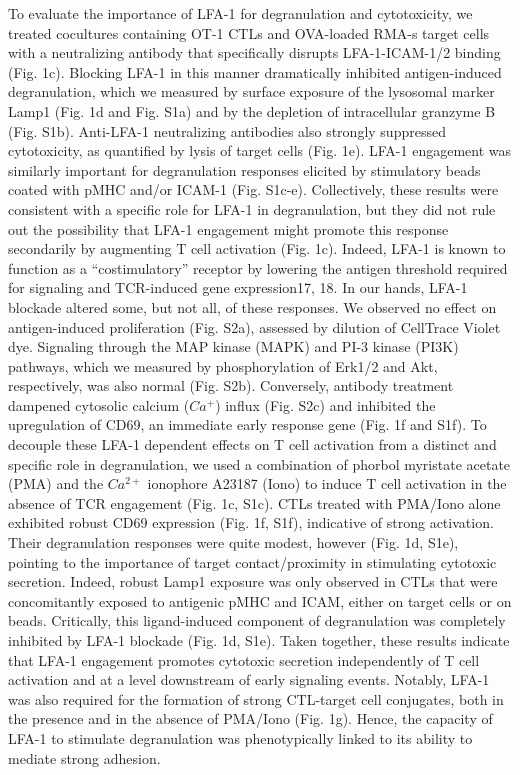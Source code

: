 To evaluate the importance of LFA-1 for degranulation and cytotoxicity, we treated cocultures containing OT-1 CTLs and OVA-loaded RMA-s target cells with a neutralizing antibody that specifically disrupts LFA-1-ICAM-1/2 binding (Fig. 1c). Blocking LFA-1 in this manner dramatically inhibited antigen-induced degranulation, which we measured by surface exposure of the lysosomal marker Lamp1 (Fig. 1d and Fig. S1a) and by the depletion of intracellular granzyme B (Fig. S1b). Anti-LFA-1 neutralizing antibodies also strongly suppressed cytotoxicity, as quantified by lysis of target cells (Fig. 1e). LFA-1 engagement was similarly important for degranulation responses elicited by stimulatory beads coated with pMHC and/or ICAM-1 (Fig. S1c-e). Collectively, these results were consistent with a specific role for LFA-1 in degranulation, but they did not rule out the possibility that LFA-1 engagement might promote this response secondarily by augmenting T cell activation (Fig. 1c). Indeed, LFA-1 is known to function as a “costimulatory” receptor by lowering the antigen threshold required for signaling and TCR-induced gene expression17, 18. In our hands, LFA-1 blockade altered some, but not all, of these responses. We observed no effect on antigen-induced proliferation (Fig. S2a), assessed by dilution of CellTrace Violet dye. Signaling through the MAP kinase (MAPK) and PI-3 kinase (PI3K) pathways, which we measured by phosphorylation of Erk1/2 and Akt, respectively, was also normal (Fig. S2b). Conversely, antibody treatment dampened cytosolic calcium ($Ca^{+}$) influx (Fig. S2c) and inhibited the upregulation of CD69, an immediate early response gene (Fig. 1f and S1f). To decouple these LFA-1 dependent effects on T cell activation from a distinct and specific role in degranulation, we used a combination of phorbol myristate acetate (PMA) and the $Ca^{2+}$ ionophore A23187 (Iono) to induce T cell activation in the absence of TCR engagement (Fig. 1c, S1c). CTLs treated with PMA/Iono alone exhibited robust CD69 expression (Fig. 1f, S1f), indicative of strong activation. Their degranulation responses were quite modest, however (Fig. 1d, S1e), pointing to the importance of target contact/proximity in stimulating cytotoxic secretion. Indeed, robust Lamp1 exposure was only observed in CTLs that were concomitantly exposed to antigenic pMHC and ICAM, either on target cells or on beads. Critically, this ligand-induced component of degranulation was completely inhibited by LFA-1 blockade (Fig. 1d, S1e). Taken together, these results indicate that LFA-1 engagement promotes cytotoxic secretion independently of T cell activation and at a level downstream of early signaling events. Notably, LFA-1 was also required for the formation of strong CTL-target cell conjugates, both in the presence and in the absence of PMA/Iono (Fig. 1g). Hence, the capacity of LFA-1 to stimulate degranulation was phenotypically linked to its ability to mediate strong adhesion. 

